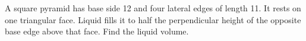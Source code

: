 A square pyramid has base side 12 and four lateral edges of length 11. It rests on one triangular face. Liquid fills it to half the perpendicular height of the opposite base edge above that face. Find the liquid volume.

